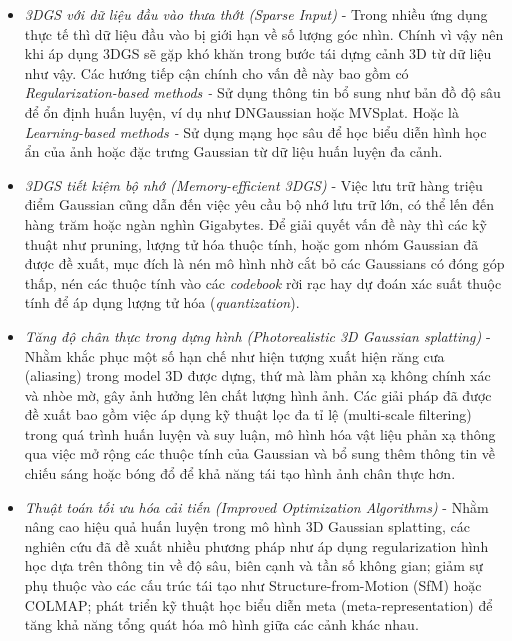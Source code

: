         \begin{itemize}
        
        
        \item \textit{3DGS với dữ liệu đầu vào thưa thớt (Sparse Input)} - Trong nhiều ứng dụng thực tế thì dữ liệu đầu vào bị giới hạn về số lượng góc nhìn. Chính vì vậy nên khi áp dụng 3DGS sẽ gặp khó khăn trong bước tái dựng cảnh 3D từ dữ liệu như vậy. Các hướng tiếp cận chính cho vấn đề này bao gồm có \textit{Regularization-based methods -} Sử dụng thông tin bổ sung như bản đồ độ sâu để ổn định huấn luyện, ví dụ như DNGaussian hoặc MVSplat. Hoặc là \textit{Learning-based methods -} Sử dụng mạng học sâu để học biểu diễn hình học ẩn của ảnh hoặc đặc trưng Gaussian từ dữ liệu huấn luyện đa cảnh. \\
        
        \item \textit{3DGS tiết kiệm bộ nhớ (Memory-efficient 3DGS)} - Việc lưu trữ hàng triệu điểm Gaussian cũng dẫn đến việc yêu cầu bộ nhớ lưu trữ lớn, có thể lến đến hàng trăm hoặc ngàn nghìn Gigabytes. Để giải quyết vấn đề này thì các kỹ thuật như pruning, lượng tử hóa thuộc tính, hoặc gom nhóm Gaussian đã được đề xuất, mục đích là nén mô hình nhờ cắt bỏ các Gaussians có đóng góp thấp, nén các thuộc tính vào các \textit{codebook} rời rạc hay dự đoán xác suất thuộc tính để áp dụng lượng tử hóa (\textit{quantization}).\\
        
        \item \textit{Tăng độ chân thực trong dựng hình (Photorealistic 3D Gaussian splatting)} - Nhằm khắc phục một số hạn chế như hiện tượng xuất hiện răng cưa (aliasing) trong model 3D được dựng, thứ mà làm phản xạ không chính xác và nhòe mờ, gây ảnh hưởng lên chất lượng hình ảnh. Các giải pháp đã được đề xuất bao gồm việc áp dụng kỹ thuật lọc đa tỉ lệ (multi-scale filtering) trong quá trình huấn luyện và suy luận, mô hình hóa vật liệu phản xạ thông qua việc mở rộng các thuộc tính của Gaussian và bổ sung thêm thông tin về chiếu sáng hoặc bóng đổ để khả năng tái tạo hình ảnh chân thực hơn.\\
        
        \item \textit{Thuật toán tối ưu hóa cải tiến (Improved Optimization Algorithms)} - Nhằm nâng cao hiệu quả huấn luyện trong mô hình 3D Gaussian splatting, các nghiên cứu đã đề xuất nhiều phương pháp như áp dụng regularization hình học dựa trên thông tin về độ sâu, biên cạnh và tần số không gian; giảm sự phụ thuộc vào các cấu trúc tái tạo như Structure-from-Motion (SfM) hoặc COLMAP; phát triển kỹ thuật học biểu diễn meta (meta-representation) để tăng khả năng tổng quát hóa mô hình giữa các cảnh khác nhau.\\
        

\end{itemize}
